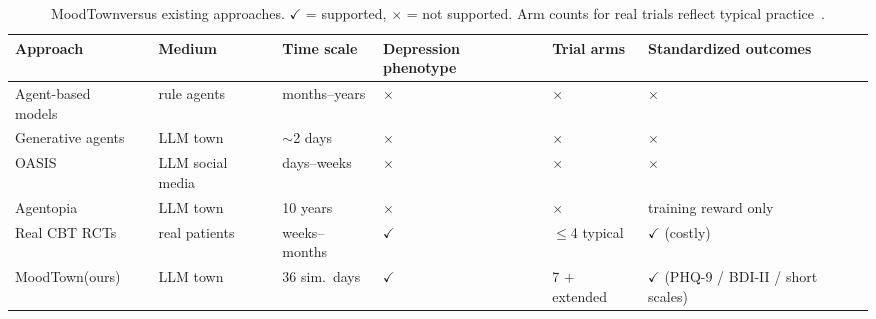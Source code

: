 \documentclass[10pt]{article}
\newcommand{\sys}{MoodTown}
\begin{document}
\begin{table}[t]
\centering
\caption{\sys versus existing approaches. $\checkmark$ = supported, $\times$ = not supported. Arm counts for real trials reflect typical practice~\citep{cuijpers2013}.}
\label{tab:comparison}
\footnotesize
\setlength{\tabcolsep}{4pt}
\begin{tabular}{@{}lp{2.1cm}p{1.5cm}p{1.35cm}p{1.0cm}p{1.6cm}@{}}
\toprule
Approach & Medium & Time scale & Depression phenotype & Trial arms & Standardized outcomes \\
\midrule
Agent-based models~\citep{bonabeau2002} & rule agents & months--years & $\times$ & $\times$ & $\times$ \\
Generative agents~\citep{park2023} & LLM town & $\sim$2 days & $\times$ & $\times$ & $\times$ \\
OASIS~\citep{oasis2024} & LLM social media & days--weeks & $\times$ & $\times$ & $\times$ \\
Agentopia~\citep{agentopia2026} & LLM town & 10 years & $\times$ & $\times$ & training reward only \\
Real CBT RCTs~\citep{cuijpers2013} & real patients & weeks--months & $\checkmark$ & $\le$4 typical & $\checkmark$ (costly) \\
\sys (ours) & LLM town & 36 sim.\ days & $\checkmark$ & 7 $+$ extended & $\checkmark$ (PHQ-9 / BDI-II / short scales) \\
\bottomrule
\end{tabular}
\end{table}
\end{document}
